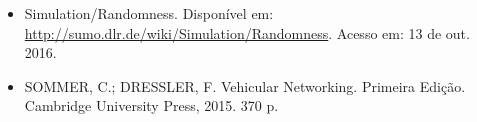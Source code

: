 \documentclass[
12pt,				%
openright,			%
oneside,			%
a4paper,			%
brazil,				%
]{abntex2}
\begin{document}
{\begin{itemize}[label={}]
		\item  Simulation/Randomness. Disponível em: \url{http://sumo.dlr.de/wiki/Simulation/Randomness}. Acesso em: 13 de out. 2016.

		\item SOMMER, C.; DRESSLER, F. Vehicular Networking. Primeira Edição. Cambridge University Press, 2015. 370 p.

	\end{itemize}
	
	
	
	
	
	
	
	
	
	
	
	\begin{anexosenv}

    	\justify
    	\setlength{\parindent}{1.3cm}
	

\end{anexosenv}}
\end{document}
